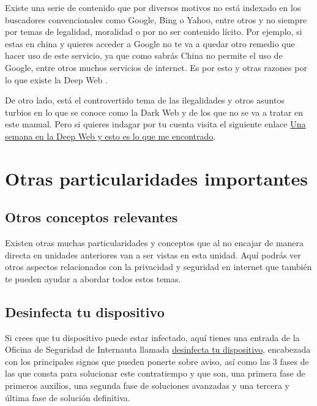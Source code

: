 \documentclass[
  spanish,
  a4paper,
  openany]{book}
\begin{document}
Existe una serie de contenido que por diversos motivos no está indexado en los buscadores convencionales como Google, Bing o Yahoo, entre otros y no siempre por temas de legalidad, moralidad o por no ser contenido lícito. Por ejemplo, si estas en china y quieres acceder a Google no te va a quedar otro remedio que hacer uso de este servicio, ya que como sabrás China no permite el uso de Google, entre otros muchos servicios de internet. Es por esto y otras razones por lo que existe la Deep Web \citep{OSI-deep-web}.

De otro lado, está el controvertido tema de las ilegalidades y otros asuntos turbios en lo que se conoce como la Dark Web y de los que no se va a tratar en este manual. Pero si quieres indagar por tu cuenta visita el siguiente enlace \href{https://www.xataka.com/analisis/una-semana-en-la-deep-web-esto-es-lo-que-me-he-encontrado}{Una semana en la Deep Web y esto es lo que me encontrado}.

\hypertarget{otras-particularidades-importantes}{%
\chapter{Otras particularidades importantes}\label{otras-particularidades-importantes}}

\hypertarget{otros-conceptos-relevantes}{%
\section{Otros conceptos relevantes}\label{otros-conceptos-relevantes}}

Existen otras muchas particularidades y conceptos que al no encajar de manera directa en unidades anteriores van a ser vistas en esta unidad. Aquí podrás ver otros aspectos relacionados con la privacidad y seguridad en internet que también te pueden ayudar a abordar todos estos temas.

\hypertarget{desinfecta-tu-dispositivo}{%
\section{Desinfecta tu dispositivo}\label{desinfecta-tu-dispositivo}}

Si crees que tu dispositivo puede estar infectado, aquí tienes una entrada de la Oficina de Seguridad de Internauta llamada \href{https://www.osi.es/es/desinfecta-tu-ordenador}{desinfecta tu dispositivo}, encabezada con los principales signos que pueden ponerte sobre aviso, así como las 3 fases de las que consta para solucionar este contratiempo y que son, una primera fase de primeros auxilios, una segunda fase de soluciones avanzadas y una tercera y última fase de solución definitiva.
\end{document}
